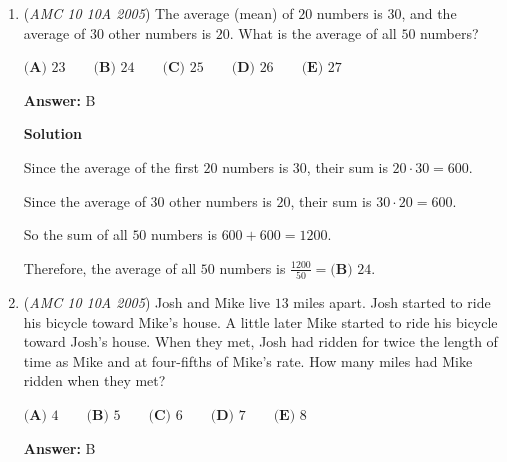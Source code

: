 \begin{enumerate}
 \textbf{Answer: }A



\textbf{Solution}

The store's offer means that every $5$th window is free, so Dave would get $\left\lfloor\frac{7}{5}\right\rfloor=1$ free window and Doug would also get $\left\lfloor\frac{8}{5}\right\rfloor=1$ free window. 

 This is a total of $1+1 = 2$ free windows. 

 Together, by contrast, they would get $\left\lfloor\frac{8+7}{5}\right\rfloor = \left\lfloor\frac{15}{5}\right\rfloor=3$ free windows.

 Hence they get $3-2=1$ additional window if they purchase the windows together, so the amount (in dollars) that they save is $1\cdot100= \boxed{\textbf{(A) } 100}$.

 


	\item (\textit{AMC 10 10A 2005}) The average (mean) of $20$ numbers is $30$, and the average of $30$ other numbers is $20$. What is the average of all $50$ numbers?


 $\textbf{(A) } 23\qquad \textbf{(B) } 24\qquad \textbf{(C) } 25\qquad \textbf{(D) } 26\qquad \textbf{(E) } 27$

 \textbf{Answer: }B



\textbf{Solution}

Since the average of the first $20$ numbers is $30$, their sum is $20\cdot30=600$. 

 Since the average of $30$ other numbers is $20$, their sum is $30\cdot20=600$. 

 So the sum of all $50$ numbers is $600+600=1200$.

 Therefore, the average of all $50$ numbers is $\frac{1200}{50}=\boxed{\textbf{(B) } 24}$.

 


	\item (\textit{AMC 10 10A 2005}) Josh and Mike live $13$ miles apart. Josh started to ride his bicycle toward Mike's house. A little later Mike started to ride his bicycle toward Josh's house. When they met, Josh had ridden for twice the length of time as Mike and at four-fifths of Mike's rate. How many miles had Mike ridden when they met? 


 $\textbf{(A) } 4\qquad \textbf{(B) } 5\qquad \textbf{(C) } 6\qquad \textbf{(D) } 7\qquad \textbf{(E) } 8$

 \textbf{Answer: }B




\end{enumerate}
